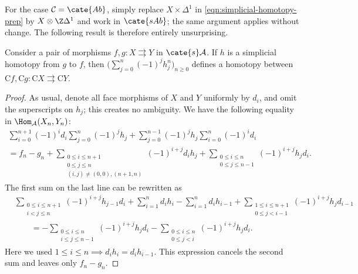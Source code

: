 For the case $\mathcal{C}=\cate{Ab}$, simply replace
$X\times\Delta^1$ in \eqref{eqn:simplicial-homotopy-prep} by
$X\otimes\Z\Delta^1$ and work in $\cate{sAb}$; the same argument applies
without change. The following result is therefore entirely unsurprising.

\begin{proposition}
	Consider a pair of morphisms $f,g:X\rightrightarrows Y$ in
	$\cate{s}\mathcal{A}$. If $h$ is a simplicial homotopy from $g$ to $f$,
	then $\bigl(\sum_{j=0}^n(-1)^jh_j^n\bigr)_{n\geq0}$ defines a homotopy
	between $\mathrm{C}f,\mathrm{C}g:\mathrm{C}X\rightrightarrows
	\mathrm{C}Y$.
\end{proposition}
\begin{proof}
	As usual, denote all face morphisms of $X$ and $Y$ uniformly by $d_i$,
	and omit the superscripts on $h_j$; this creates no ambiguity. We have the
	following equality in $\Hom_{\mathcal{A}}(X_n,Y_n)$:
	\begin{multline*}
		\sum_{i=0}^{n+1}(-1)^id_i\sum_{j=0}^n(-1)^jh_j
		+\sum_{j=0}^{n-1}(-1)^jh_j\sum_{i=0}^n(-1)^id_i\\
		=f_n-g_n
		+\sum_{\substack{0\leq i\leq n+1\\0\leq j\leq n\\
		(i,j)\neq(0,0),(n+1,n)}}(-1)^{i+j}d_ih_j
		+\sum_{\substack{0\leq i\leq n\\0\leq j\leq n-1}}
		(-1)^{i+j}h_jd_i.
	\end{multline*}
	The first sum on the last line can be rewritten as
	\begin{align*}
		&\sum_{\substack{0\leq i\leq n+1\\i<j\leq n}}
		(-1)^{i+j}h_{j-1}d_i
		+\sum_{i=1}^nd_ih_i-\sum_{i=1}^nd_ih_{i-1}
		+\sum_{\substack{1\leq i\leq n+1\\0\leq j<i-1}}
		(-1)^{i+j}h_jd_{i-1}\\
		&\qquad=-\sum_{\substack{0\leq i\leq n\\i\leq j\leq n-1}}
		(-1)^{i+j}h_jd_i
		-\sum_{\substack{0\leq i\leq n\\0\leq j<i}}
		(-1)^{i+j}h_jd_i.
	\end{align*}
	Here we used $1\leq i\leq n\implies d_ih_i=d_ih_{i-1}$. This expression
	cancels the second sum and leaves only $f_n-g_n$.
\end{proof}

